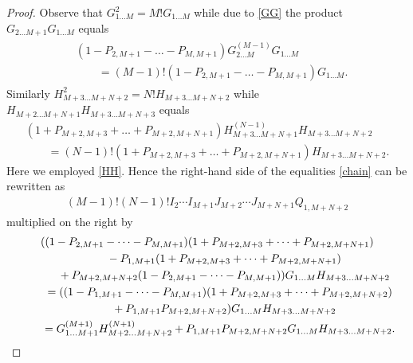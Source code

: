 \documentclass[pdftex]{sigma}
\numberwithin{equation}{section}
\begin{document}
\begin{proof}
Observe that
$G_{1 \dots M}^{2}=M ! G_{1 \dots M}$
while due to \eqref{GG} the product
$G_{2 \dots M+1} G_{1 \dots M}$ equals
\begin{gather*}
\begin{split} &
 ( 1-P_{2,M+1}-\dots-P_{M,M+1} )
G^{(M-1)}_{2 \dots M} G_{1 \dots M}\\
& \qquad {} =(M-1) ! ( 1-P_{2,M+1}-\dots-P_{M,M+1} ) G_{1 \dots M} .
\end{split}
\end{gather*}
Similarly
$H_{M+3 \dots M+N+2}^{2}=N ! H_{M+3 \dots M+N+2}$ while
$H_{M+2 \dots M+N+1} H_{M+3 \dots M+N+3}$ equals
\begin{gather*}
 ( 1+P_{M+2,M+3}+\dots+P_{M+2,M+N+1} )
H^{(N-1)}_{M+3 \dots M+N+1} H_{M+3 \dots M+N+2}\\
\qquad{} =(N-1) ! ( 1+P_{M+2,M+3}+\dots+P_{M+2,M+N+1} )
H_{M+3 \dots M+N+2} .
\end{gather*}
Here we employed \eqref{HH}. Hence the right-hand side of the equalities \eqref{chain}
can be rewritten as
\begin{gather}\label{MN}
(M-1) ! (N-1) !
I_{2} \cdots I_{M+1}
J_{M+2} \cdots J_{M+N+1}
Q_{1,M+N+2}
\end{gather}
multiplied on the right by
\begin{gather}
( ( 1-P_{2,M+1}-\dots-P_{M,M+1} )
( 1+P_{M+2,M+3}+\dots+P_{M+2,M+N+1} )\notag\\
\qquad\quad {} - P_{1,M+1}( 1+P_{M+2,M+3}+\dots+P_{M+2,M+N+1} )\notag\\
\qquad\quad {} +P_{M+2,M+N+2} ( 1-P_{2,M+1}-\dots-P_{M,M+1} ) )
G_{1 \dots M} H_{M+3 \dots M+N+2}\notag\\
\qquad {}= ( ( 1-P_{1,M+1}-\dots-P_{M,M+1} )
( 1+P_{M+2,M+3}+\dots+P_{M+2,M+N+2} )\notag\\
\qquad\quad {}+
P_{1,M+1} P_{M+2,M+N+2} )
G_{1 \dots M} H_{M+3 \dots M+N+2}\notag\\
\qquad{} = G^{(M+1)}_{1 \dots M+1} H^{(N+1)}_{M+2 \dots M+N+2}
+ P_{1,M+1} P_{M+2,M+N+2}
G_{1 \dots M} H_{M+3 \dots M+N+2} .\label{GH}
\end{gather}


\end{proof}
\end{document}
